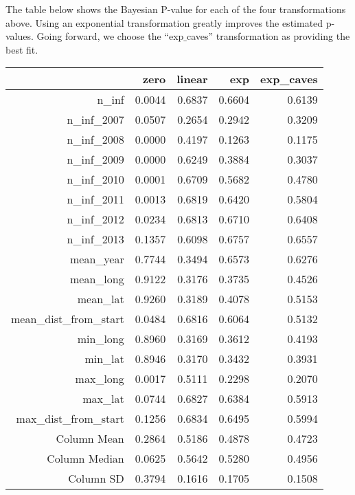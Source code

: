 \documentclass[11pt]{article}
\begin{document}
The table below shows the Bayesian P-value for each of the four
transformations above.  Using an exponential transformation greatly
improves the estimated p-values.  Going forward, we choose the
``exp\(\_\)caves'' transformation as providing the best fit.
\begin{table}[ht]
\centering
\begin{tabular}{rrrrr}
  & zero & linear & exp & exp\_caves \\ 
  \hline
n\_inf & 0.0044 & 0.6837 & 0.6604 & 0.6139 \\ 
  n\_inf\_2007 & 0.0507 & 0.2654 & 0.2942 & 0.3209 \\ 
  n\_inf\_2008 & 0.0000 & 0.4197 & 0.1263 & 0.1175 \\ 
  n\_inf\_2009 & 0.0000 & 0.6249 & 0.3884 & 0.3037 \\ 
  n\_inf\_2010 & 0.0001 & 0.6709 & 0.5682 & 0.4780 \\ 
  n\_inf\_2011 & 0.0013 & 0.6819 & 0.6420 & 0.5804 \\ 
  n\_inf\_2012 & 0.0234 & 0.6813 & 0.6710 & 0.6408 \\ 
  n\_inf\_2013 & 0.1357 & 0.6098 & 0.6757 & 0.6557 \\ 
  mean\_year & 0.7744 & 0.3494 & 0.6573 & 0.6276 \\ 
  mean\_long & 0.9122 & 0.3176 & 0.3735 & 0.4526 \\ 
  mean\_lat & 0.9260 & 0.3189 & 0.4078 & 0.5153 \\ 
  mean\_dist\_from\_start & 0.0484 & 0.6816 & 0.6064 & 0.5132 \\ 
  min\_long & 0.8960 & 0.3169 & 0.3612 & 0.4193 \\ 
  min\_lat & 0.8946 & 0.3170 & 0.3432 & 0.3931 \\ 
  max\_long & 0.0017 & 0.5111 & 0.2298 & 0.2070 \\ 
  max\_lat & 0.0744 & 0.6827 & 0.6384 & 0.5913 \\ 
  max\_dist\_from\_start & 0.1256 & 0.6834 & 0.6495 & 0.5994 \\ 
   \hline
Column Mean & 0.2864 & 0.5186 & 0.4878 & 0.4723 \\ 
  Column Median & 0.0625 & 0.5642 & 0.5280 & 0.4956 \\ 
  Column SD & 0.3794 & 0.1616 & 0.1705 & 0.1508 \\ 
   \hline
\end{tabular}
\end{table}
\end{document}
